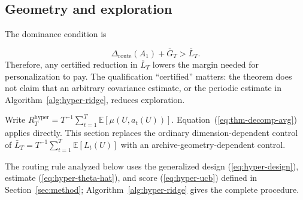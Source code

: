 \documentclass{article} %
\providecommand{\Droute}{\Delta_{\mathrm{route}}}
\renewcommand{\eqref}[1]{\textup{(\ref{#1})}}
\begin{document}
\subsection{Geometry and exploration}

The dominance condition is

\begin{equation}
\Droute(A_1) + \bar{G}_T > \bar{L}_T .
\end{equation}
Therefore, any certified reduction in $\bar L_T$ lowers the margin needed for
personalization to pay. The qualification ``certified'' matters: the theorem
does not claim that an arbitrary covariance estimate, or the periodic estimate
in Algorithm~\ref{alg:hyper-ridge}, reduces exploration.




Write
\(R_T^{\mathrm{hyper}}
=T^{-1}\sum_{t=1}^{T}\mathbb{E}[\mu(U,a_t(U))]\).
Equation~\eqref{eq:thm-decomp-avg} applies directly. This section replaces the
ordinary dimension-dependent control of
\(\bar L_T=T^{-1}\sum_{t=1}^{T}\mathbb{E}[L_t(U)]\)
with an archive-geometry-dependent control.

The routing rule analyzed below uses the generalized design
\eqref{eq:hyper-design}, estimate \eqref{eq:hyper-theta-hat}, and score
\eqref{eq:hyper-ucb} defined in Section~\ref{sec:method}; Algorithm~\ref{alg:hyper-ridge}
gives the complete procedure.
\end{document}

